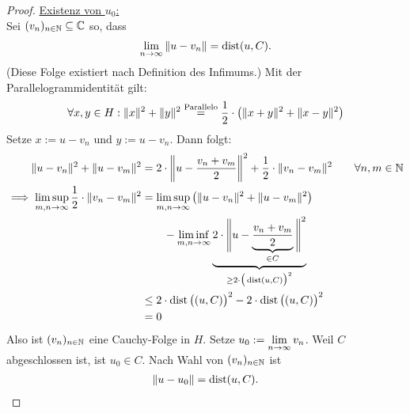 \begin{proof}
	\underline{Existenz von $u_0$:}\\
	Sei $(v_n)_{n\in\mathbb{N}}\subseteq\mathbb{C}$ so, dass
	\begin{align*}
		\lim\limits_{n\to\infty}\Vert u-v_n\Vert
		=\operatorname{dist}(u,C).
	\end{align*}
	(Diese Folge existiert nach Definition des Infimums.) 
	Mit der Parallelogrammidentität gilt:
	\begin{align*}
		\forall x,y\in H:\Vert x\Vert^2+\Vert y\Vert^2\overset{\text{Parallelo}}{=}\frac{1}{2}\cdot\left(\Vert x+y\Vert^2+\Vert x-y\Vert^2\right)
	\end{align*}
	Setze $x:=u-v_n$ und $y:=u-v_n$. 
	Dann folgt:
	\begin{align*}
		\Vert u-v_n\Vert^2+\Vert u-v_m\Vert^2
		&=2\cdot\left\Vert u-\frac{v_n+v_m}{2}\right\Vert^2+\frac{1}{2}\cdot\Vert v_n-v_m\Vert^2
		\qquad\forall n,m\in\mathbb{N}\\
		\implies
		\limsup\limits_{m,n\to\infty}\frac{1}{2}\cdot\Vert v_n-v_m\Vert^2
		&=\limsup\limits_{m,n\to\infty}\left(\Vert u-v_n\Vert^2+\Vert u-v_m\Vert^2\right)\\
		&\qquad-\liminf\limits_{m,n\to\infty} \underbrace{2\cdot\Bigg\Vert u-\underbrace{\frac{v_n+v_m}{2}}_{\in C}\Bigg\Vert^2}_{\geq2\cdot\big(\operatorname{dist}(u,C)\big)^2}\\
		&\leq2\cdot\operatorname{dist}\big((u,C)\big)^2-2\cdot\operatorname{dist}\big((u,C)\big)^2\\
		&=0
	\end{align*}
	Also ist $(v_n)_{n\in\mathbb{N}}$ eine Cauchy-Folge in $H$. Setze $u_0:=\lim\limits_{n\to\infty} v_n$. 
	Weil $C$ abgeschlossen ist, ist $u_0\in C$. Nach Wahl von $(v_n)_{n\in\mathbb{N}}$ ist
	\begin{align*}
		\Vert u-u_0\Vert=\operatorname{dist}(u,C).
	\end{align*}


\end{proof}
